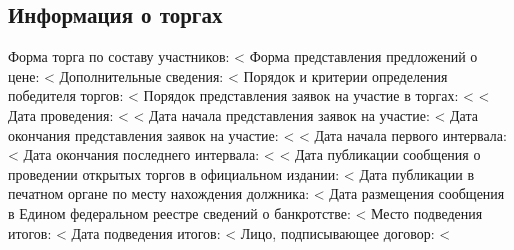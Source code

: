 \documentclass[a4paper,12pt]{article}
\begin{document}
{{{{{{{	\subsection*{Информация о торгах}
	{\color{Gray} Форма торга по составу участников:} <%
	\linebreak
	{\color{Gray} Форма представления предложений о цене:} <%
	\linebreak
	{\color{Gray} Дополнительные сведения:} <%
	\linebreak
	{\color{Gray} Порядок и критерии определения победителя торгов:} <%
	\linebreak
	{\color{Gray} Порядок представления заявок на участие в торгах:} <%
	\linebreak
	<%
		{\color{Gray} Дата проведения:} <%
		\linebreak
	<%
	{\color{Gray} Дата начала представления заявок на участие:} <%
	\linebreak
	{\color{Gray} Дата окончания представления заявок на участие:} <%
	\linebreak
	<%
		{\color{Gray} Дата начала первого интервала:} <%
		\linebreak
		{\color{Gray} Дата окончания последнего интервала:} <%
		\linebreak
	<%
	{\color{Gray} Дата публикации сообщения о проведении открытых торгов в официальном издании:} <%
	\linebreak
	{\color{Gray} Дата публикации в печатном органе по месту нахождения должника:} <%
	\linebreak
	{\color{Gray} Дата размещения сообщения в Едином федеральном реестре сведений о банкротстве:} <%
	\linebreak
	{\color{Gray} Место подведения итогов:} <%
	\linebreak
	{\color{Gray} Дата подведения итогов:} <%
	\linebreak
	{\color{Gray} Лицо, подписывающее договор:} <%
	\linebreak
	\linebreak



}}}}}}}
\end{document}
